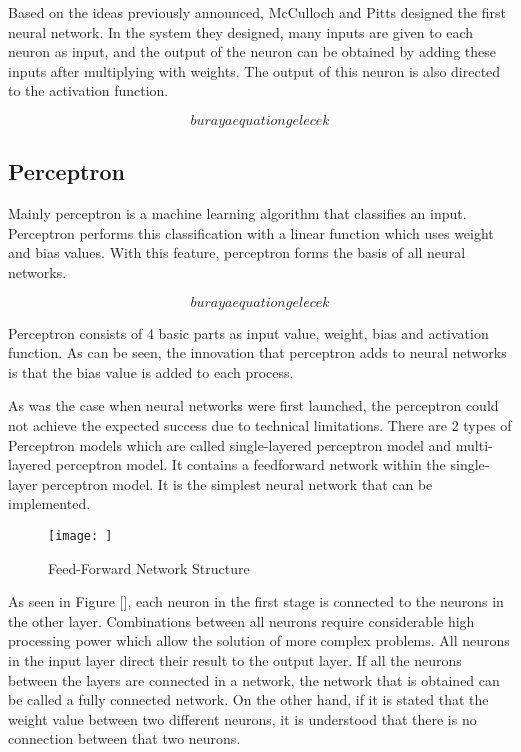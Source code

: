 Based on the ideas previously announced, McCulloch and Pitts designed the first neural network. In the system they designed, many inputs are given to each neuron as input, and the output of the neuron can be obtained by adding these inputs after multiplying with weights. The output of this neuron is also directed to the activation function.

\begin{equation}
    buraya equation gelecek
\end{equation}

\subsection{Perceptron}

Mainly perceptron is a machine learning algorithm that classifies an input. Perceptron performs this classification with a linear function which uses weight and bias values. With this feature, perceptron forms the basis of all neural networks.

\begin{equation}
    buraya equation gelecek
\end{equation}

Perceptron consists of 4 basic parts as input value, weight, bias and activation function. As can be seen, the innovation that perceptron adds to neural networks is that the bias value is added to each process.

As was the case when neural networks were first launched, the perceptron could not achieve the expected success due to technical limitations. There are 2 types of Perceptron models which are called single-layered perceptron model and multi-layered perceptron model. It contains a feedforward network within the single-layer perceptron model. It is the simplest neural network that can be implemented.

\begin{figure}[h]
    \centering
    \texttt{[image: ]}
    \caption{Feed-Forward Network Structure}
    \label{fig:my_label}
\end{figure}

As seen in Figure [], each neuron in the first stage is connected to the neurons in the other layer. Combinations between all neurons require considerable high processing power which allow the solution of more complex problems. All neurons in the input layer direct their result to the output layer. If all the neurons between the layers are connected in a network, the network that is obtained can be called a fully connected network. On the other hand, if it is stated that the weight value between two different neurons, it is understood that there is no connection between that two neurons.

